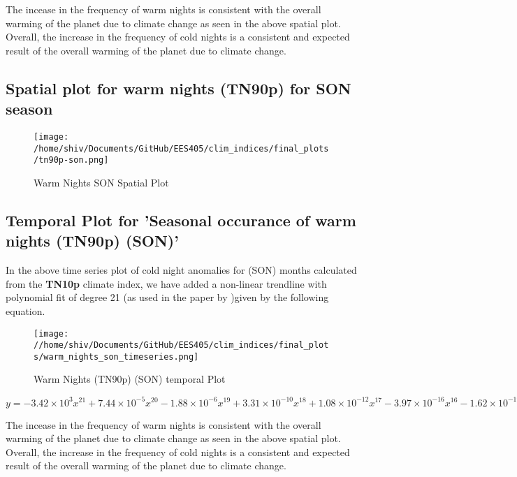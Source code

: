 \documentclass[a4paper, 12pt, twoside]{report}
\begin{document}
The incease in the frequency of warm nights is consistent with the overall warming of the planet due to climate change as seen in the above spatial plot.\\
Overall, the increase in the frequency of cold nights is a consistent and expected result of the overall warming of the planet due to climate change.

\newpage

\subsection{Spatial plot for warm nights (TN90p) for SON season}
\begin{figure}[htb]
    \centering
    \texttt{[image: /home/shiv/Documents/GitHub/EES405/clim\_indices/final\_plots/tn90p-son.png]}
    \caption{Warm Nights SON Spatial Plot}
    \label{fig:tn90p_son_spatial}
\end{figure}

\subsection{Temporal Plot for 'Seasonal occurance of warm nights (TN90p) (SON)'}
In the above time series plot of cold night anomalies for (SON) months calculated from the \textbf{TN10p} climate index, we have added a non-linear trendline with polynomial fit of degree 21 (as used in the paper by )given by the following equation.
\begin{figure}[htb]
    \centering
    \texttt{[image: //home/shiv/Documents/GitHub/EES405/clim\_indices/final\_plots/warm\_nights\_son\_timeseries.png]}
    \caption{Warm Nights (TN90p) (SON) temporal Plot}
    \label{fig:tn90p_son_temporal}
\end{figure}

$ y = -3.42\times10^{3}x^{21}+7.44\times10^{-5}x^{20}-1.88\times10^{-6}x^{19}+3.31\times10^{-10}x^{18}+1.08\times10^{-12}x^{17}-3.97\times10^{-16}x^{16}-1.62\times10^{-19}x^{15}+1.05\times10^{-22}x^{14}-5.80\times10^{-27}x^{13}-8.00\times10^{-30}x^{12}+2.29\times10^{-33}x^{11}-1.20\times10^{-37}x^{10}-6.72\times10^{-41}x^{9}+1.99\times10^{-44}x^{8}-2.95\times10^{-48}x^{7}+2.85\times10^{-52}x^{6}-1.92\times10^{-56}x^{5}+9.12\times10^{-61}x^{4}-3.03\times10^{-65}x^{3}+6.69\times10^{-70}x^{2}-8.87\times10^{-75}x+5.34\times10^{-80}$

The incease in the frequency of warm nights is consistent with the overall warming of the planet due to climate change as seen in the above spatial plot.\\
Overall, the increase in the frequency of cold nights is a consistent and expected result of the overall warming of the planet due to climate change.
\end{document}
